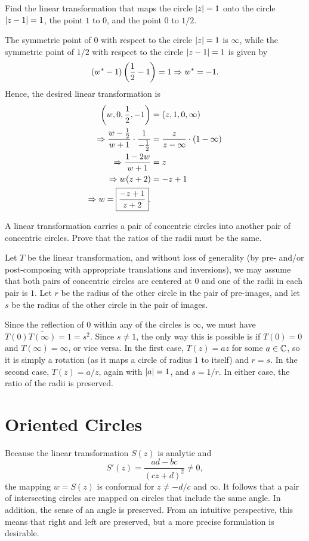 \begin{exercise}
	Find the linear transformation that maps the circle $\lvert z \rvert=1$ onto the circle $\lvert z-1 \rvert=1$, the point $1$ to $0$, and the point $0$ to $1/2$.

	\begin{sol}
		The symmetric point of $0$ with respect to the circle $\lvert z \rvert=1$ is $\infty$, while the symmetric point of $1/2$ with respect to the circle $\lvert z-1 \rvert=1$ is given by $$(w^*-1)\left(\dfrac{1}{2}-1\right)=1 \Rightarrow w^*=-1.$$ Hence, the desired linear transformation is
		\begin{align*}
			\left(w, 0, \dfrac{1}{2},-1\right) &=(z, 1, 0, \infty) \\
			\Rightarrow \dfrac{w-\frac{1}{2}}{w+1} \cdot \dfrac{1}{-\frac{1}{2}} &=\dfrac{z}{z-\infty} \cdot (1-\infty) \\
			\Rightarrow \dfrac{1-2w}{w+1} &=z \\
			\Rightarrow w(z+2) &=-z+1 \\
			\Rightarrow w=\boxed{\dfrac{-z+1}{z+2}}.
		\end{align*}
	\end{sol}
\end{exercise}
\begin{exercise}
	A linear transformation carries a pair of concentric circles into another pair of concentric circles. Prove that the ratios of the radii must be the same.
	
	\begin{sol}
		Let $T$ be the linear transformation, and without loss of generality (by pre- and/or post-composing with appropriate translations and inversions), we may assume that both pairs of concentric circles are centered at $0$ and one of the radii in each pair is $1$. Let $r$ be the radius of the other circle in the pair of pre-images, and let $s$ be the radius of the other circle in the pair of images.
		
		Since the reflection of $0$ within any of the circles is $\infty$, we must have $T(0)\overline{T(\infty)}=1=s^2$. Since $s \neq 1$, the only way this is possible is if $T(0)=0$ and $T(\infty)=\infty$, or vice versa. In the first case, $T(z)=az$ for some $a \in \mathbb C$, so it is simply a rotation (as it maps a circle of radius $1$ to itself) and $r=s$. In the second case, $T(z)=a/z$, again with $\lvert a \rvert=1$, and $s=1/r$. In either case, the ratio of the radii is preserved. \qedsymbol 
	\end{sol}
\end{exercise}

\section{Oriented Circles}
Because the linear transformation $S(z)$ is analytic and $$S'(z)=\dfrac{ad-bc}{(cz+d)^2} \neq 0,$$ the mapping $w=S(z)$ is conformal for $z \neq -d/c$ and $\infty$. It follows that a pair of intersecting circles are mapped on circles that include the same angle. In addition, the sense of an angle is preserved. From an intuitive perspective, this means that right and left are preserved, but a more precise formulation is desirable.


